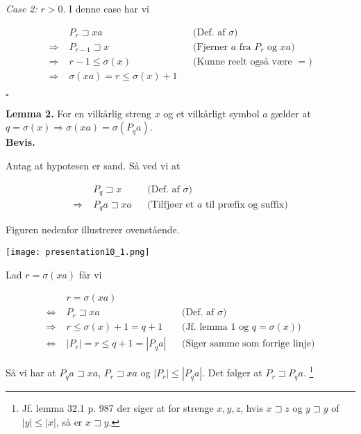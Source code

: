 \documentclass[12pt]{article}
\begin{document}
\textit{Case 2:} $r>0$. I denne case har vi 

\begin{align*}
    &P_r \sqsupset xa && \text{(Def. af } \sigma) \\
    \Rightarrow \; &P_{r-1} \sqsupset x && \text{(Fjerner } a \text{ fra } P_r \text{ og } xa) \\
    \Rightarrow \; &r-1 \le \sigma(x) && \text{(Kunne reelt også være } =) \\
    \Rightarrow \; &\sigma(xa) = r \le \sigma(x)+1
\end{align*}

\begin{flushright}
    $\square$
\end{flushright}

\textbf{Lemma 2.} For en vilkårlig streng $x$ og et vilkårligt symbol $a$ gælder at $q = \sigma(x) \Rightarrow \sigma(xa)=\sigma(P_q a)$. \\

\textbf{Bevis.}

Antag at hypotesen er sand. Så ved vi at

\begin{align*}
    &P_q \sqsupset x && \text{(Def. af } \sigma) \\
    \Rightarrow \; &P_q a \sqsupset xa && \text{(Tilfjøer et } a \text{ til præfix og suffix)}
\end{align*}

Figuren nedenfor illustrerer ovenstående. 

\begin{center}
\texttt{[image: presentation10\_1.png]}
\end{center}

Lad $r=\sigma(xa)$ får vi

\begin{align*}
    &r = \sigma(xa) \\
    \Leftrightarrow \; &P_r \sqsupset xa && \text{(Def. af } \sigma) \\
    \Rightarrow \; &r \le \sigma(x)+1= q+1 && \text{(Jf. lemma 1 og  } q=\sigma(x)) \\
    \Leftrightarrow \; &|P_r| = r \le q+1 = |P_q a| && \text{(Siger samme som forrige linje)}
\end{align*}

Så vi har at $P_q a \sqsupset xa$, $P_r \sqsupset xa$ og $|P_r| \le |P_q a|$. Det følger at $P_r \sqsupset P_q a$. \footnote{Jf. lemma 32.1 p. 987 der siger at for strenge $x,y,z$, hvis $x \sqsupset z$ og $y \sqsupset y$ of $|y| \le |x|$, så er $x \sqsupset y$.} \\
\end{document}
